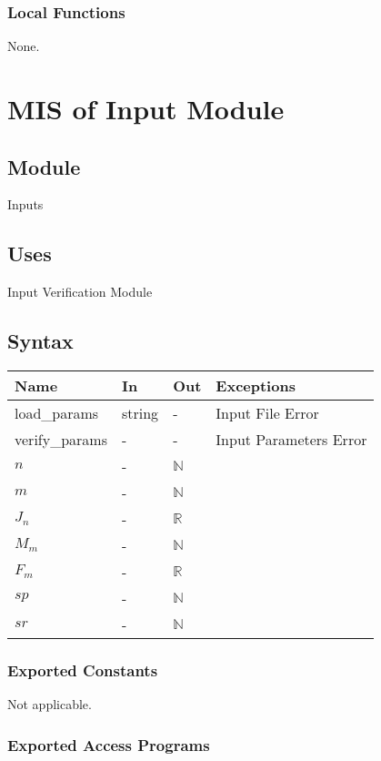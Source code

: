 \documentclass[12pt, titlepage]{article}
\begin{document}
\subsubsection{Local Functions}

None.
\section{MIS of Input Module \label{mInput} }

\subsection{Module}

Inputs 

\subsection{Uses}
Input Verification Module

\subsection{Syntax}
\begin{tabular}{p{3cm} p{1cm} p{1cm} >{\raggedright\arraybackslash}p{9cm}}
\toprule
\textbf{Name} & \textbf{In} & \textbf{Out} & \textbf{Exceptions} \\
\midrule
load\_params & string & - &  Input File Error \\
verify\_params & - & - & Input Parameters Error\\
$n$ & -& $\mathbb{N}$\\
$m$ & -& $\mathbb{N}$\\
$J_n$ & -& $\mathbb{R}$\\
$M_m$ & - & $\mathbb{N}$\\
$F_m$ & - & $\mathbb{R}$\\
$sp$ & - & $\mathbb{N}$\\
$sr$ & - & $\mathbb{N}$\\
\bottomrule
\end{tabular}

\subsubsection{Exported Constants}
Not applicable.

\subsubsection{Exported Access Programs}
\end{document}
